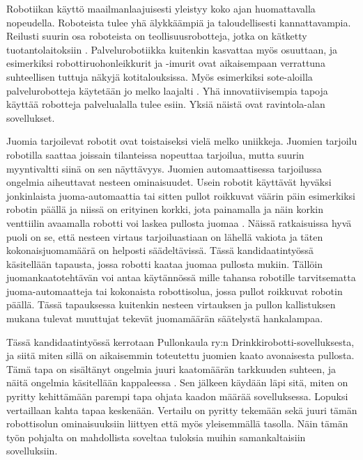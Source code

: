 Robotiikan käyttö maailmanlaajuisesti yleistyy koko ajan huomattavalla nopeudella. Roboteista tulee yhä älykkäämpiä ja taloudellisesti kannattavampia. Reilusti suurin osa roboteista on teollisuusrobotteja, jotka on kätketty tuotantolaitoksiin \cite{Heer2020}. Palvelurobotiikka kuitenkin kasvattaa myös osuuttaan, ja esimerkiksi robottiruohonleikkurit ja -imurit ovat aikaisempaan verrattuna suhteellisen tuttuja näkyjä kotitalouksissa. Myös esimerkiksi sote-aloilla palvelurobotteja käytetään jo melko laajalti \cite{Jyvaskylanyliopisto2018}. Yhä innovatiivisempia tapoja käyttää robotteja palvelualalla tulee esiin. Yksiä näistä ovat ravintola-alan sovellukset.

Juomia tarjoilevat robotit ovat toistaiseksi vielä melko uniikkeja. Juomien tarjoilu robotilla saattaa joissain tilanteissa nopeuttaa tarjoilua, mutta suurin myyntivaltti siinä on sen näyttävyys. Juomien automaattisessa tarjoilussa ongelmia aiheuttavat nesteen ominaisuudet. Usein robotit käyttävät hyväksi jonkinlaista juoma-automaattia \cite{Kelly2020} tai sitten pullot roikkuvat väärin päin esimerkiksi robotin päällä ja niissä on erityinen korkki, jota painamalla ja näin korkin venttiilin avaamalla robotti voi laskea pullosta juomaa \cite{Ro2016}. Näissä ratkaisuissa hyvä puoli on se, että nesteen virtaus tarjoiluastiaan on lähellä vakiota ja täten kokonaisjuomamäärä on helposti säädeltävissä. Tässä kandidaatintyössä käsitellään tapausta, jossa robotti kaataa juomaa pullosta mukiin. Tällöin juomankaatotehtävän voi antaa käytännössä mille tahansa robotille tarvitsematta juoma-automaatteja tai kokonaista robottisolua, jossa pullot roikkuvat robotin päällä. Tässä tapauksessa kuitenkin nesteen virtauksen ja pullon kallistuksen mukana tulevat muuttujat tekevät juomamäärän säätelystä hankalampaa.

Tässä kandidaatintyössä kerrotaan Pullonkaula ry:n Drinkkirobotti-sovelluksesta, ja siitä miten sillä on aikaisemmin toteutettu juomien kaato avonaisesta pullosta. Tämä tapa on sisältänyt ongelmia juuri kaatomäärän tarkkuuden suhteen, ja näitä ongelmia käsitellään kappaleessa . Sen jälkeen käydään läpi sitä, miten on pyritty kehittämään parempi tapa ohjata kaadon määrää sovelluksessa. Lopuksi vertaillaan kahta tapaa keskenään. Vertailu on pyritty tekemään sekä juuri tämän robottisolun ominaisuuksiin liittyen että myös yleisemmällä tasolla. Näin tämän työn pohjalta on mahdollista soveltaa tuloksia muihin samankaltaisiin sovelluksiin.
